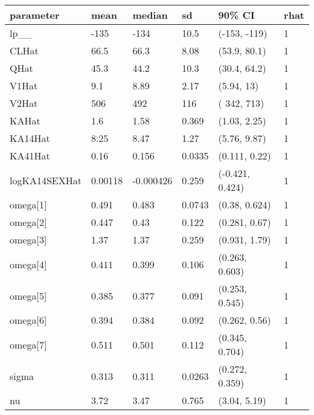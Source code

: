 
\begin{tabular}{l|l|l|l|l|l}
\hline
parameter & mean & median & sd & 90\% CI & rhat\\
\hline
lp\_\_ & -135 & -134 & 10.5 & (-153, -119) & 1\\
\hline
CLHat & 66.5 & 66.3 & 8.08 & (53.9, 80.1) & 1\\
\hline
QHat & 45.3 & 44.2 & 10.3 & (30.4, 64.2) & 1\\
\hline
V1Hat & 9.1 & 8.89 & 2.17 & (5.94,   13) & 1\\
\hline
V2Hat & 506 & 492 & 116 & ( 342,  713) & 1\\
\hline
KAHat & 1.6 & 1.58 & 0.369 & (1.03, 2.25) & 1\\
\hline
KA14Hat & 8.25 & 8.47 & 1.27 & (5.76, 9.87) & 1\\
\hline
KA41Hat & 0.16 & 0.156 & 0.0335 & (0.111, 0.22) & 1\\
\hline
logKA14SEXHat & 0.00118 & -0.000426 & 0.259 & (-0.421, 0.424) & 1\\
\hline
omega[1] & 0.491 & 0.483 & 0.0743 & (0.38, 0.624) & 1\\
\hline
omega[2] & 0.447 & 0.43 & 0.122 & (0.281, 0.67) & 1\\
\hline
omega[3] & 1.37 & 1.37 & 0.259 & (0.931, 1.79) & 1\\
\hline
omega[4] & 0.411 & 0.399 & 0.106 & (0.263, 0.603) & 1\\
\hline
omega[5] & 0.385 & 0.377 & 0.091 & (0.253, 0.545) & 1\\
\hline
omega[6] & 0.394 & 0.384 & 0.092 & (0.262, 0.56) & 1\\
\hline
omega[7] & 0.511 & 0.501 & 0.112 & (0.345, 0.704) & 1\\
\hline
sigma & 0.313 & 0.311 & 0.0263 & (0.272, 0.359) & 1\\
\hline
nu & 3.72 & 3.47 & 0.765 & (3.04, 5.19) & 1\\
\hline
\end{tabular}
